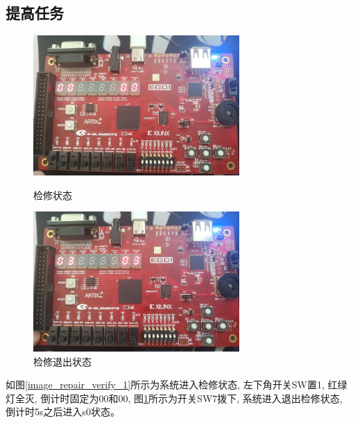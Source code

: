 \documentclass{article}
\begin{document}
\subsection*{提高任务}
\begin{figure}
    \begin{minipage}[t]{0.45\linewidth}
        \centering
        \includegraphics[width=0.7\textwidth]{image/2024-06-19-20-58-40.png}
        \caption{检修状态}
        \label{image_repair_verify_1}
    \end{minipage}
    \begin{minipage}[t]{0.45\linewidth}
        \centering
        \includegraphics[width=0.7\textwidth]{image/2024-06-19-21-00-32.png}
        \caption{检修退出状态}
        \label{image_repair_verify_2}
    \end{minipage}
\end{figure}
如图\ref{image_repair_verify_1}所示为系统进入检修状态, 左下角开关SW置1, 红绿灯全灭, 倒计时固定为00和00,
 图\ref{image_repair_verify_2}所示为开关SW7拨下, 系统进入退出检修状态, 倒计时5s之后进入s0状态。\\ 
\end{document}
